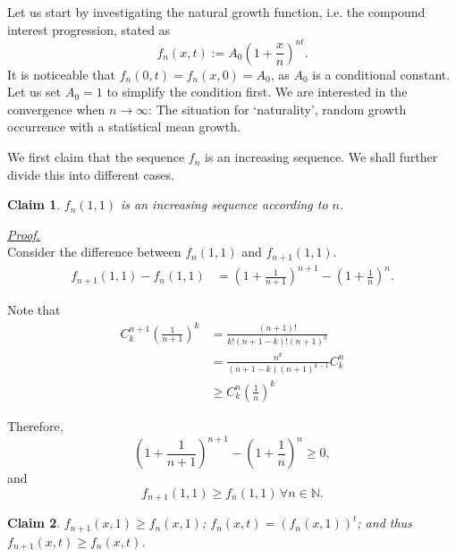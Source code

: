 \documentclass[12pt]{article}
\newtheorem*{claim}{Claim}
\renewenvironment{proof}[1][Proof]{\begin{snugshade*} \underline{\textit{{#1}.}}\\}{\hfill \qedsymbol \end{snugshade*}}
\begin{document}
    Let us start by investigating the natural growth function, i.e. the compound interest progression, stated as \[f_n(x,t):=A_0(1+\frac{x}{n})^{nt}.\] It is noticeable that $f_n(0,t)=f_n(x,0)=A_0$, as $A_0$ is a conditional constant. Let us set $A_0=1$ to simplify the condition first. We are interested in the convergence when $n\to \infty$: The situation for `naturality', random growth occurrence with a statistical mean growth.

    We first claim that the sequence $f_n$ is an increasing sequence. We shall further divide this into different cases.
    
    \begin{claim}
        $f_n(1,1)$ is an increasing sequence according to $n$.
    \end{claim}

    \begin{proof}
        Consider the difference between $f_n(1,1)$ and $f_{n+1}(1,1)$.
        \begin{align*}
            f_{n+1}(1,1)-f_n(1,1)&=(1+\frac{1}{n+1})^{n+1}-(1+\frac{1}{n})^n.
        \end{align*}
        
        Note that \begin{align*}
            C_k^{n+1}(\frac{1}{n+1})^k&=\frac{(n+1)!}{k!(n+1-k)!(n+1)^k}\\
            &=\frac{n^k}{(n+1-k)(n+1)^{k-1}}C_k^n\\
            &\geq C_k^n(\frac{1}{n})^k
        \end{align*}

        Therefore, \[(1+\frac{1}{n+1})^{n+1}-(1+\frac{1}{n})^n\geq 0,\] and \[f_{n+1}(1,1)\geq f_n(1,1)\,\forall n\in\mathbb{N}.\]
    \end{proof}

    \begin{claim}
        $f_{n+1}(x,1)\geq f_n(x,1)$; $f_n(x,t)=(f_n(x,1))^t$; and thus $f_{n+1}(x,t)\geq f_n(x,t)$.
    \end{claim}
\end{document}

